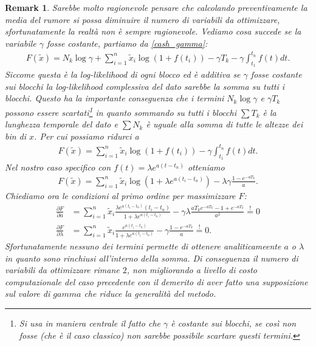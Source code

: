 \documentclass[10pt,a4paper]{report}
\newtheorem{remark}{Remark}
\begin{document}
\begin{remark}
Sarebbe molto ragionevole pensare che calcolando preventivamente la media del rumore si possa diminuire il numero di variabili da ottimizzare, sfortunatamente la realtà non è sempre ragionevole. Vediamo cosa succede se la variabile $\gamma$ fosse costante, partiamo da \eqref{cash_gamma}:
\begin{align*}
F(\tilde{x}) = N_k\log\gamma + \sum_{i=1}^n\tilde{x}_i\log(1+f(t_i)) -\gamma T_k -\gamma\int_{t_1}^{t_n}f(t) dt.
\end{align*}
Siccome questa è la log-likelihood di ogni blocco ed è additiva se $\gamma$ fosse costante sui blocchi la log-likelihood complessiva del dato sarebbe la somma su tutti i blocchi. Questo ha la importante conseguenza che i termini $N_k\log\gamma$ e $\gamma T_k$ possono essere scartati\footnote{Si usa in maniera centrale il fatto che $\gamma$ è costante sui blocchi, se così non fosse (che è il caso classico) non sarebbe possibile scartare questi termini.} in quanto sommando su tutti i blocchi $\sum T_k$ è la lunghezza temporale del dato e $\sum N_k$ è uguale alla somma di tutte le altezze dei bin di $x$. Per cui possiamo ridurci a
\begin{align*}
F(\tilde{x}) = \sum_{i=1}^n\tilde{x}_i\log(1+f(t_i)) -\gamma\int_{t_1}^{t_n}f(t) dt.
\end{align*}
Nel nostro caso specifico con $f(t)=\lambda e^{a(t-t_n)}$ otteniamo
\begin{align*}
F(\tilde{x}) = \sum_{i=1}^n\tilde{x}_i\log(1+\lambda e^{a(t_i-t_n)}) -\lambda\gamma\frac{1-e^{-aT_k}}{a}.
\end{align*}
Chiediamo ora le condizioni al primo ordine per massimizzare $F$:
\begin{align*}
\frac{\partial F}{\partial a} &= \sum_{i=1}^n\tilde{x}_i\frac{\lambda e^{a(t_i-t_n)}(t_i-t_n)}{1+\lambda e^{a(t_i-t_n)}}-\gamma\lambda\frac{aT_ke^{-aT_k}-1+e^{-aT_k}}{a^2}\stackrel{!}{=}0\\
\frac{\partial F}{\partial \lambda} &= \sum_{i=1}^n\tilde{x}_i\frac{e^{a(t_i-t_n)}}{1+\lambda e^{a(t_i-t_n)}}-\gamma\frac{1-e^{-aT_k}}{a}\stackrel{!}{=}0.
\end{align*}
Sfortunatamente nessuno dei termini permette di ottenere analiticameente $a$ o $\lambda$ in quanto sono rinchiusi all'interno della somma. Di conseguenza il numero di variabili da ottimizzare rimane $2$, non migliorando a livello di costo computazionale del caso precedente con il demerito di aver fatto una supposizione sul valore di $gamma$ che riduce la generalità del metodo.


\end{remark}
\end{document}
